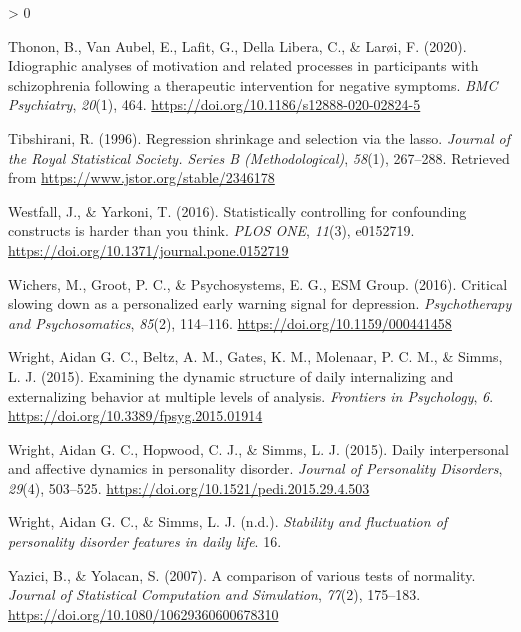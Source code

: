 \documentclass[
  english,
  man]{apa6}
\newlength{\cslhangindent}
\newenvironment{CSLReferences}[2] %
 {%
  \setlength{\parindent}{0pt}
  \ifodd #1 \everypar{\setlength{\hangindent}{\cslhangindent}}\ignorespaces\fi
  \ifnum #2 > 0
  \setlength{\parskip}{#2\baselineskip}
  \fi
 }%
 {}
\begin{document}
\begin{CSLReferences}{1}{0}
\leavevmode\hypertarget{ref-ThononEtAl2020}{}%
Thonon, B., Van Aubel, E., Lafit, G., Della Libera, C., \& Larøi, F. (2020). Idiographic analyses of motivation and related processes in participants with schizophrenia following a therapeutic intervention for negative symptoms. \emph{BMC Psychiatry}, \emph{20}(1), 464. \url{https://doi.org/10.1186/s12888-020-02824-5}

\leavevmode\hypertarget{ref-Tibshirani1996}{}%
Tibshirani, R. (1996). Regression shrinkage and selection via the lasso. \emph{Journal of the Royal Statistical Society. Series B (Methodological)}, \emph{58}(1), 267--288. Retrieved from \url{https://www.jstor.org/stable/2346178}

\leavevmode\hypertarget{ref-WestfallYarkoni2016}{}%
Westfall, J., \& Yarkoni, T. (2016). Statistically controlling for confounding constructs is harder than you think. \emph{PLOS ONE}, \emph{11}(3), e0152719. \url{https://doi.org/10.1371/journal.pone.0152719}

\leavevmode\hypertarget{ref-WichersEtAl2016}{}%
Wichers, M., Groot, P. C., \& Psychosystems, E. G., ESM Group. (2016). Critical slowing down as a personalized early warning signal for depression. \emph{Psychotherapy and Psychosomatics}, \emph{85}(2), 114--116. \url{https://doi.org/10.1159/000441458}

\leavevmode\hypertarget{ref-WrightEtAl2015a}{}%
Wright, Aidan G. C., Beltz, A. M., Gates, K. M., Molenaar, P. C. M., \& Simms, L. J. (2015). Examining the dynamic structure of daily internalizing and externalizing behavior at multiple levels of analysis. \emph{Frontiers in Psychology}, \emph{6}. \url{https://doi.org/10.3389/fpsyg.2015.01914}

\leavevmode\hypertarget{ref-WrightEtAl2015}{}%
Wright, Aidan G. C., Hopwood, C. J., \& Simms, L. J. (2015). Daily interpersonal and affective dynamics in personality disorder. \emph{Journal of Personality Disorders}, \emph{29}(4), 503--525. \url{https://doi.org/10.1521/pedi.2015.29.4.503}

\leavevmode\hypertarget{ref-WrightSimms}{}%
Wright, Aidan G. C., \& Simms, L. J. (n.d.). \emph{Stability and fluctuation of personality disorder features in daily life}. 16.

\leavevmode\hypertarget{ref-YaziciYolacan2007}{}%
Yazici, B., \& Yolacan, S. (2007). A comparison of various tests of normality. \emph{Journal of Statistical Computation and Simulation}, \emph{77}(2), 175--183. \url{https://doi.org/10.1080/10629360600678310}

\end{CSLReferences}

\endgroup
\end{document}
